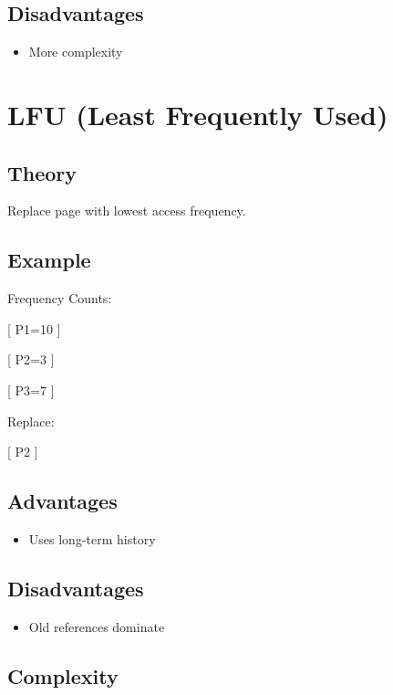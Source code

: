 \subsection{Disadvantages}

\begin{itemize}
\item More complexity
\end{itemize}

\section{LFU (Least Frequently Used)}

\subsection{Theory}

Replace page with lowest access frequency.

\subsection{Example}

Frequency Counts:

[
P1=10
]

[
P2=3
]

[
P3=7
]

Replace:

[
P2
]

\subsection{Advantages}

\begin{itemize}
\item Uses long-term history
\end{itemize}

\subsection{Disadvantages}

\begin{itemize}
\item Old references dominate
\end{itemize}

\subsection{Complexity}

